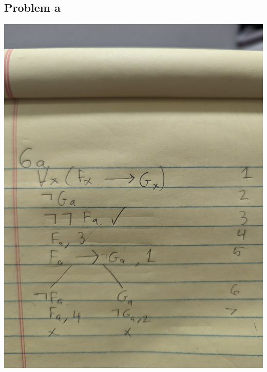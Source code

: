 \documentclass[12pt]{article}
\begin{document}
\subsection*{Problem a}
\includegraphics[width=\textwidth]{6a}
\end{document}
